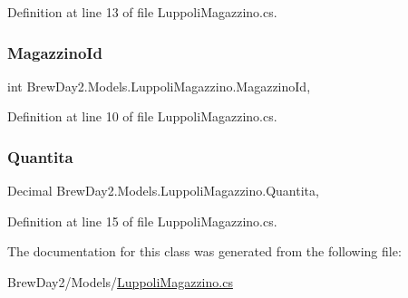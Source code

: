 Definition at line 13 of file Luppoli\+Magazzino.\+cs.

\mbox{\label{class_brew_day2_1_1_models_1_1_luppoli_magazzino_a8e14651a7195faf94f277199e4bff982}} 
\subsubsection{\texorpdfstring{Magazzino\+Id}{MagazzinoId}}
{\footnotesize\ttfamily int Brew\+Day2.\+Models.\+Luppoli\+Magazzino.\+Magazzino\+Id\hspace{0.3cm}{\ttfamily [get]}, {\ttfamily [set]}}



Definition at line 10 of file Luppoli\+Magazzino.\+cs.

\mbox{\label{class_brew_day2_1_1_models_1_1_luppoli_magazzino_a8a72c41477527027ca80c173462f9fc4}} 
\subsubsection{\texorpdfstring{Quantita}{Quantita}}
{\footnotesize\ttfamily Decimal Brew\+Day2.\+Models.\+Luppoli\+Magazzino.\+Quantita\hspace{0.3cm}{\ttfamily [get]}, {\ttfamily [set]}}



Definition at line 15 of file Luppoli\+Magazzino.\+cs.



The documentation for this class was generated from the following file\+:\begin{DoxyCompactItemize}
\item 
Brew\+Day2/\+Models/\mbox{\hyperlink{_luppoli_magazzino_8cs}{Luppoli\+Magazzino.\+cs}}\end{DoxyCompactItemize}
